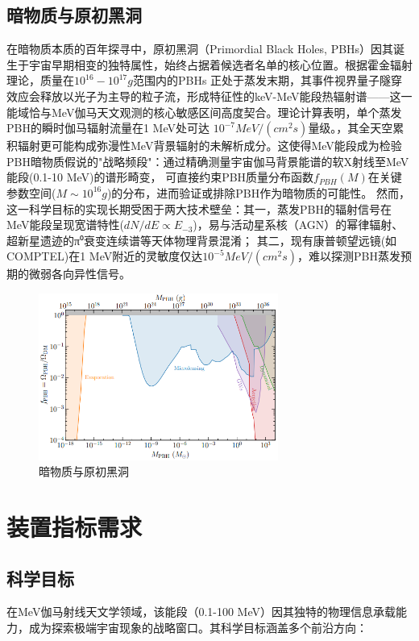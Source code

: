 \subsection{暗物质与原初黑洞}
\label{subsec:darkmatter}
在暗物质本质的百年探寻中，原初黑洞（Primordial Black Holes, PBHs）因其诞生于宇宙早期相变的独特属性，始终占据着候选者名单的核心位置。根据霍金辐射理论，质量在$10^{16}-10^{17}g$范围内的PBHs
正处于蒸发末期，其事件视界量子隧穿效应会释放以光子为主导的粒子流，形成特征性的keV-MeV能段热辐射谱——这一能域恰与MeV伽马天文观测的核心敏感区间高度契合。理论计算表明，单个蒸发PBH的瞬时伽马辐射流量在1 MeV处可达
$10^{-7}MeV/(cm^2s)$量级。，其全天空累积辐射更可能构成弥漫性MeV背景辐射的未解析成分。这使得MeV能段成为检验PBH暗物质假说的"战略频段"：通过精确测量宇宙伽马背景能谱的软X射线至MeV能段(0.1-10 MeV)的谱形畸变，
可直接约束PBH质量分布函数$f_{PBH}(M)$在关键参数空间($M \sim 10^{16} g$)的分布，进而验证或排除PBH作为暗物质的可能性。
然而，这一科学目标的实现长期受困于两大技术壁垒：其一，蒸发PBH的辐射信号在MeV能段呈现宽谱特性($dN/dE \propto E_{-3} $)，易与活动星系核（AGN）的幂律辐射、超新星遗迹的π⁰衰变连续谱等天体物理背景混淆；
其二，现有康普顿望远镜(如COMPTEL)在1 MeV附近的灵敏度仅达$10^{-5} MeV/(cm^2 s)$，难以探测PBH蒸发预期的微弱各向异性信号。
\begin{figure}[H]
	\centering
	\includegraphics[width=0.7\textwidth]{figures/暗物质与原初黑洞.png}
	\caption{暗物质与原初黑洞} \label{fig:darkmatter}
\end{figure}

\section{装置指标需求}

\subsection{科学目标}
在MeV伽马射线天文学领域，该能段（0.1-100 MeV）因其独特的物理信息承载能力，成为探索极端宇宙现象的战略窗口。其科学目标涵盖多个前沿方向：
